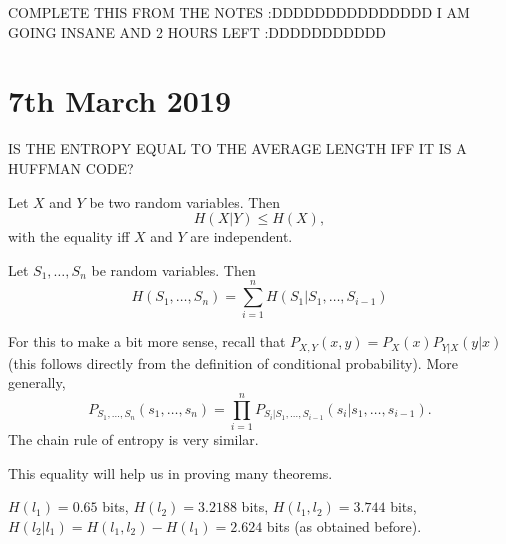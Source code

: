\documentclass{report}
\begin{document}
\begin{exmp}[continuation]
COMPLETE THIS FROM THE NOTES :DDDDDDDDDDDDDDD I AM GOING INSANE AND 2 HOURS LEFT :DDDDDDDDDDD
\end{exmp}

\section{7th March 2019}

IS THE ENTROPY EQUAL TO THE AVERAGE LENGTH IFF IT IS A HUFFMAN CODE?

\begin{thm}
	Let $X$ and $Y$ be two random variables. Then
	\begin{equation}
		H(X|Y) \leq H(X),
	\end{equation}
	with the equality iff $X$ and $Y$ are independent.
\end{thm}

\begin{thm}
	Let $S_1, \ldots, S_n$ be random variables. Then
	\begin{equation}
		\boxed{H(S_1, \ldots, S_n) = \sum_{i=1}^n H(S_1 | S_1, \ldots, S_{i-1})}
	\end{equation}
\end{thm}

 For this to make a bit more sense, recall that $P_{X, Y}(x, y) = P_X(x)P_{Y|X}(y|x)$ (this follows directly from the definition of conditional probability). More generally, 
 \begin{equation*}
 P_{S_1, \ldots, S_n}(s_1, \ldots, s_n) = \prod_{i=1}^n P_{S_i | S_1, \ldots, S_{i-1}}(s_i | s_1, \ldots, s_{i-1}).
 \end{equation*}
 The chain rule of entropy is very similar. \par
 This equality will help us in proving many theorems.
 
 \begin{exmp}[continuation]
 	$H(l_1) = 0.65$ bits, $H(l_2) = 3.2188$ bits, $H(l_1, l_2) = 3.744$ bits, $H(l_2 | l_1) = H(l_1, l_2) - H(l_1) = 2.624$ bits (as obtained before).
 \end{exmp}
 
\end{document}
